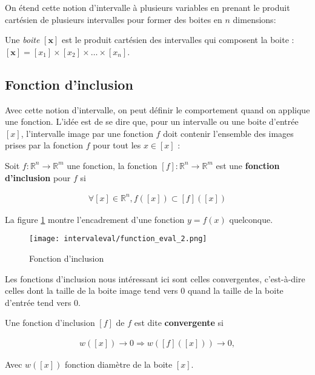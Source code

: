 On étend cette notion d'intervalle à plusieurs variables en prenant le produit cartésien de plusieurs intervalles pour former des boites en $n$ dimensions:

\begin{definition}
  Une \textit{boite} $[\textbf{x}]$ est le produit cartésien des intervalles qui composent la boite : $[\textbf{x}] = [x_1] \times [x_2] \times \dots \times [x_n]$.
\end{definition}

\subsection{Fonction d'inclusion}
Avec cette notion d'intervalle, on peut définir le comportement quand on applique une fonction. L'idée est de se dire que, pour un intervalle ou une boite d'entrée $[x]$, l'intervalle image par une fonction $f$ doit contenir l'ensemble des images prises par la fonction $f$ pour tout les $x \in [x]$ :

\begin{definition}
    Soit $f : \mathbb{R}^n \rightarrow \mathbb{R}^m$ une fonction, la fonction $[f] : \mathbb{R}^n \rightarrow \mathbb{R}^m$ est une \textbf{fonction d'inclusion} pour $f$ si

    \begin{align}
        \forall[x] \in \mathbb{R}^n , f([x]) \subset [f]([x])
    \end{align}
\end{definition}

\begin{ex}
  La figure \ref{fig:fct2} montre l'encadrement d'une fonction $y = f(x)$ quelconque.

  \begin{figure}[H]
    \centering
    \texttt{[image: intervaleval/function\_eval\_2.png]}
    \caption{Fonction d'inclusion}
    \label{fig:fct2}
  \end{figure}
\end{ex}

Les fonctions d'inclusion nous intéressant ici sont celles convergentes, c'est-à-dire celles dont la taille de la boite image tend vers 0 quand la taille de la boite d'entrée tend vers 0.

\begin{definition}
  Une fonction d'inclusion $[f]$ de $f$ est dite \textbf{convergente} si 

  \begin{align}
    w([x]) \rightarrow 0 \Rightarrow w([f]([x])) \rightarrow 0,
  \end{align}

  Avec $w([x])$ fonction diamètre de la boite $[x]$.
\end{definition}

